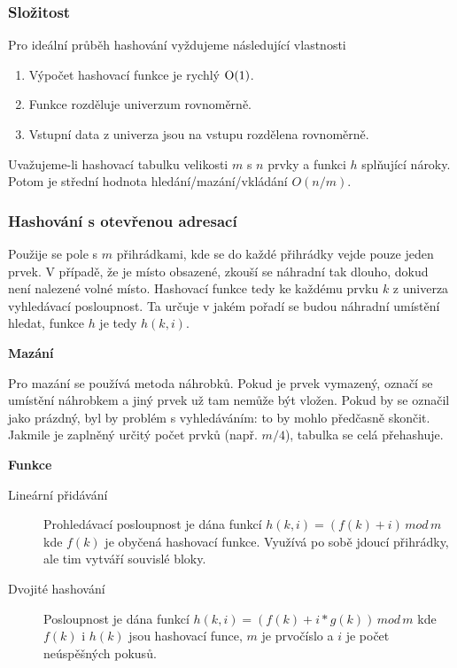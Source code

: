       \subsubsection{Složitost}
        Pro ideální průběh hashování vyždujeme následující vlastnosti
        \begin{enumerate}
          \item Výpočet hashovací funkce je rychlý $\textrm O(1)$.
          \item Funkce rozděluje univerzum rovnoměrně.
          \item Vstupní data z univerza jsou na vstupu rozdělena rovnoměrně.
        \end{enumerate}

        Uvažujeme-li hashovací tabulku velikosti $m$ s $n$ prvky a funkci $h$ splňující nároky.
        Potom je střední hodnota hledání/mazání/vkládání $O(n/m)$.

      \subsubsection{Hashování s otevřenou adresací}
        Použije se pole s $m$ přihrádkami, kde se do každé přihrádky vejde pouze jeden prvek.
        V případě, že je místo obsazené, zkouší se náhradní tak dlouho, dokud není nalezené volné místo.
        Hashovací funkce tedy ke každému prvku $k$ z univerza vyhledávací posloupnost.
        Ta určuje v jakém pořadí se budou náhradní umístění hledat, funkce $h$ je tedy $h(k, i)$.

        \textbf{Mazání}

          Pro mazání se používá metoda náhrobků. Pokud je prvek vymazený, označí se umístění náhrobkem a jiný prvek už tam nemůže být vložen.
          Pokud by se označil jako prázdný, byl by problém s vyhledáváním: to by mohlo předčasně skončit.
          Jakmile je zaplněný určitý počet prvků (např. $m/4$), tabulka se celá přehashuje.

        \textbf{Funkce}
        
          \begin{description}
            \item[Lineární přidávání] Prohledávací posloupnost je dána funkcí $h(k, i) = (f(k) + i) \, mod \, m$ kde $f(k)$ je obyčená hashovací funkce. Využívá po sobě jdoucí přihrádky, ale tim vytváří souvislé bloky.
            \item[Dvojité hashování] Posloupnost je dána funkcí $h(k, i) = (f(k) + i * g(k)) \, mod \, m$ kde $f(k)$ i $h(k)$ jsou hashovací funce, $m$ je prvočíslo a $i$ je počet neúspěšných pokusů.
          \end{description}
